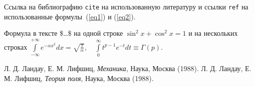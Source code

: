 \documentclass[12pt]{article}
\begin{document}
Ссылка на библиографию \verb+cite+ на использованную литературу\cite{ref1,ref2}
и ссылки \verb+ref+ на использованные формулы~(\ref{eq1}) и (\ref{eq2}).

Формула в тексте \$\ldots\$ на одной строке $\sin^2x + \cos^2x = 1$ и на
нескольких строках $\int\limits_{-\infty}^{+\infty} e^{-\alpha x^2} dx =
\sqrt{\frac{\pi}{\alpha}},\quad \int\limits_{0}^{\infty} t^{p - 1} e^{-t} dt
\equiv \Gamma(p) $.

\begin{thebibliography}{9}
    Л. Д. Ландау, Е. М. Лифшиц, \textit{Механика}, Наука, Москва (1988).
    Л. Д. Ландау, Е. М. Лифшиц, \textit{Теория поля}, Наука, Москва (1988).
\end{thebibliography}
\end{document}
